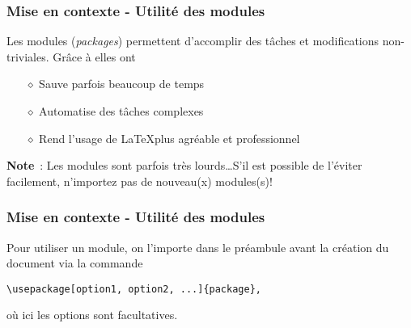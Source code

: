 
\begin{frame}
    \frametitle{Mise en contexte - Utilité des modules}
    Les modules (\textit{packages}) permettent d'accomplir
    des tâches et modifications non-triviales. Grâce à elles ont
    \vspace{0.3cm}
    \begin{itemize}
        \pause
        \item[$\diamond$] Sauve parfois beaucoup de temps
        \pause
        \item[$\diamond$] Automatise des tâches complexes
        \pause
        \item[$\diamond$] Rend l'usage de \LaTeX\;plus agréable et professionnel
    \end{itemize}
    \vfill
    \pause
    \begin{mybrownbox}
        \textbf{Note}~: Les modules sont parfois très lourds\dots\;S'il est possible de l'éviter
        facilement, n'importez pas de nouveau(x) modules(s)!
    \end{mybrownbox}
\end{frame}

\begin{frame}[fragile]
    \frametitle{Mise en contexte - Utilité des modules}
    Pour utiliser un module, on l'importe dans le préambule \textcolor{vibrant_green}{avant la création du
    document} via la commande
    \vfill
    \begin{lstlisting}[xleftmargin=-10mm]
        \usepackage[option1, option2, ...]{package},
    \end{lstlisting}
    \vfill
    où ici les options sont facultatives.
\end{frame}
